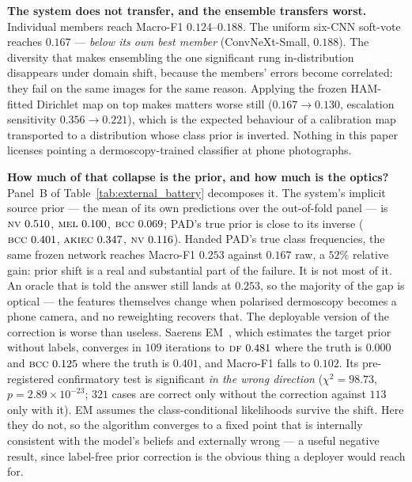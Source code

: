 \documentclass[journal]{IEEEtran}
\begin{document}
\textbf{The system does not transfer, and the ensemble transfers worst.} Individual members
reach Macro-F1 $0.124$--$0.188$. The uniform six-CNN soft-vote reaches $0.167$ --- \emph{below
its own best member} (ConvNeXt-Small, $0.188$). The diversity that makes ensembling the one
significant rung in-distribution disappears under domain shift, because the members' errors
become correlated: they fail on the same images for the same reason. Applying the frozen
HAM-fitted Dirichlet map on top makes matters worse still ($0.167 \rightarrow 0.130$,
escalation sensitivity $0.356 \rightarrow 0.221$), which is the expected behaviour of a
calibration map transported to a distribution whose class prior is inverted. Nothing in this
paper licenses pointing a dermoscopy-trained classifier at phone photographs.

\textbf{How much of that collapse is the prior, and how much is the optics?} Panel~B of
Table~\ref{tab:external_battery} decomposes it. The system's implicit source prior --- the
mean of its own predictions over the out-of-fold panel --- is $\textsc{nv}\ 0.510$,
$\textsc{mel}\ 0.100$, $\textsc{bcc}\ 0.069$; PAD's true prior is close to its inverse
($\textsc{bcc}\ 0.401$, $\textsc{akiec}\ 0.347$, $\textsc{nv}\ 0.116$). Handed PAD's true
class frequencies, the same frozen network reaches Macro-F1 $0.253$ against $0.167$ raw, a
$52\%$ relative gain: prior shift is a real and substantial part of the failure. It is not
most of it. An oracle that is told the answer still lands at $0.253$, so the majority of the
gap is optical --- the features themselves change when polarised dermoscopy becomes a phone
camera, and no reweighting recovers that. The deployable version of the correction is worse
than useless. Saerens EM~\cite{saerens2002adjusting}, which estimates the target prior
without labels, converges in $109$ iterations to $\textsc{df}\ 0.481$ where the truth is
$0.000$ and $\textsc{bcc}\ 0.125$ where the truth is $0.401$, and Macro-F1 falls to $0.102$.
Its pre-registered confirmatory test is significant \emph{in the wrong direction}
($\chi^2 = 98.73$, $p = 2.89\times10^{-23}$; $321$ cases are correct only without the
correction against $113$ only with it). EM assumes the class-conditional likelihoods survive
the shift. Here they do not, so the algorithm converges to a fixed point that is internally
consistent with the model's beliefs and externally wrong --- a useful negative result, since
label-free prior correction is the obvious thing a deployer would reach for.
\end{document}
